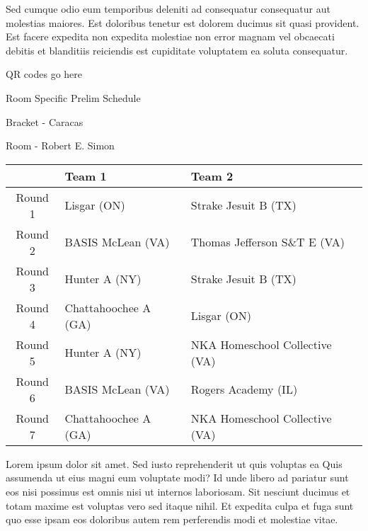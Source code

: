 \documentclass{article}%
\begin{document}
\newline%
Sed cumque odio eum temporibus deleniti ad consequatur consequatur aut molestias maiores. Est doloribus tenetur est dolorem ducimus sit quasi provident. Est facere expedita non expedita molestiae non error magnam vel obcaecati debitis et blanditiis reiciendis est cupiditate voluptatem ea soluta consequatur.%
\vspace*{140pt}%
\begin{center}%
\begin{Huge}%
QR codes go here%
\end{Huge}%
\end{center}%
\newpage%
\begin{center}%
\begin{Huge}%
Room Specific Prelim Schedule%
\end{Huge}%
\vspace*{8pt}%
\linebreak%
\begin{Large}%
Bracket {-} Caracas%
\end{Large}%
\vspace*{8pt}%
\linebreak%
\vspace*{8pt}%
\begin{Large}%
Room {-} Robert E. Simon%
\end{Large}%
\end{center}%
%
\begin{tabularx}{\textwidth}{|c|Y|Y|}%
\hline%
&Team 1&Team 2\\%
\hline%
Round 1&Lisgar (ON)&Strake Jesuit B (TX)\\%
Round 2&BASIS McLean (VA)&Thomas Jefferson S\&T E (VA)\\%
Round 3&Hunter A (NY)&Strake Jesuit B (TX)\\%
Round 4&Chattahoochee A (GA)&Lisgar (ON)\\%
Round 5&Hunter A (NY)&NKA Homeschool Collective (VA)\\%
Round 6&BASIS McLean (VA)&Rogers Academy (IL)\\%
Round 7&Chattahoochee A (GA)&NKA Homeschool Collective (VA)\\%
\hline%
\end{tabularx}%
\vspace*{8pt}%
\newline%
Lorem ipsum dolor sit amet. Sed iusto reprehenderit ut quis voluptas ea Quis assumenda ut eius magni eum voluptate modi? Id unde libero ad pariatur sunt eos nisi possimus est omnis nisi ut internos laboriosam. Sit nesciunt ducimus et totam maxime est voluptas vero sed itaque nihil. Et expedita culpa et fuga sunt quo esse ipsam eos doloribus autem rem perferendis modi et molestiae vitae.\newline%
\end{document}
